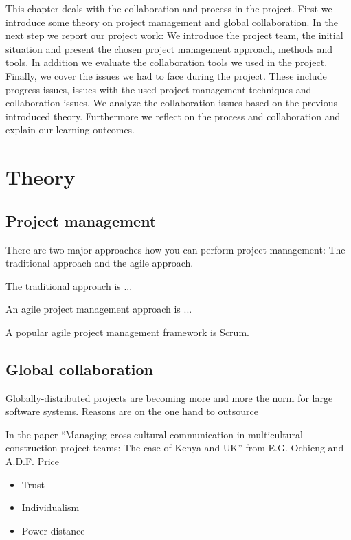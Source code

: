This chapter deals with the collaboration and process in the project. First we introduce some theory on project management and global collaboration. In the next step we report our project work: We introduce the project team, the initial situation and present the chosen project management approach, methods and tools. In addition we evaluate the collaboration tools we used in the project. Finally, we cover the issues we had to face during the project. These include progress issues, issues with the used project management techniques and collaboration issues. We analyze the collaboration issues based on the previous introduced theory. Furthermore we reflect on the process and collaboration and explain our learning outcomes.


\section{Theory}

\subsection{Project management}

There are two major approaches how you can perform project management: The traditional approach and the agile approach.

The traditional approach is ... 

An agile project management approach is ... 

A popular agile project management framework is Scrum. 

\subsection{Global collaboration} 
Globally-distributed projects are becoming more and more the norm for large software systems. Reasons are on the one hand to outsource 

In the paper “Managing cross-cultural communication in multicultural construction project teams: The case of Kenya and UK”  from E.G. Ochieng and A.D.F. Price

	\begin{itemize}
		\item Trust
		\item Individualism
		\item Power distance
	\end{itemize}

